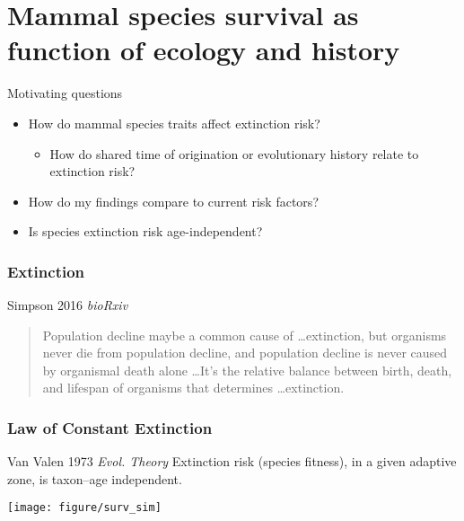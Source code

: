 \documentclass{beamer}
\begin{document}
\section{Mammal species survival as function of ecology and history}


\begin{frame}
  \begin{alertblock}{Motivating questions}
    \begin{itemize}
      \item How do mammal species traits affect extinction risk?
        \begin{itemize}
          \item How do shared time of origination or evolutionary history relate to extinction risk?
        \end{itemize}
      \item How do my findings compare to current risk factors?
      \item Is species extinction risk age-independent?
    \end{itemize}
  \end{alertblock}
\end{frame}

\begin{frame}
  \frametitle{Extinction}
  \begin{block}{Simpson 2016 \em{bioRxiv}}
    \begin{quote}
      Population decline maybe a common cause of \dots extinction, but organisms never die from population decline, and population decline is never caused by organismal death alone \dots It's the relative balance between birth, death, and lifespan of organisms that determines \dots extinction. 
    \end{quote}
  \end{block}
\end{frame}

\begin{frame}
  \frametitle{Law of Constant Extinction}

  \begin{block}{Van Valen 1973 \em{Evol. Theory}}
    Extinction risk (species fitness), in a given adaptive zone, is taxon--age independent.
  \end{block}

  \begin{center}
    \texttt{[image: figure/surv\_sim]}
  \end{center}

\end{frame}
\end{document}
